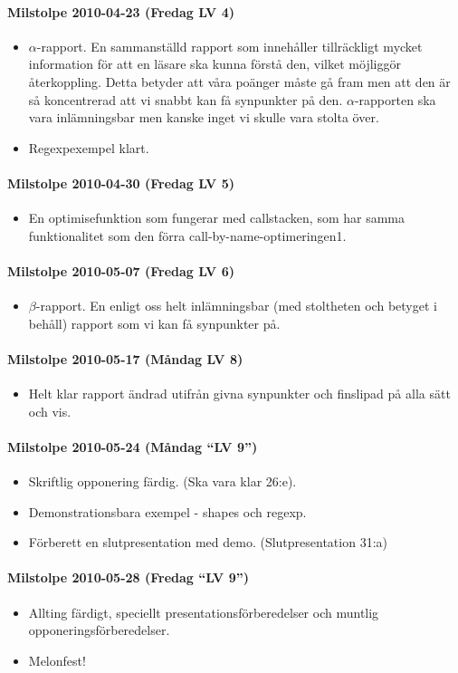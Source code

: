 \documentclass[../Appendix]{subfiles}
\begin{document}
\paragraph{Milstolpe 2010-04-23 (Fredag LV 4)}
\begin{itemize}
\item $\alpha$-rapport. En sammanställd rapport som innehåller tillräckligt
mycket information för att en läsare ska kunna förstå den, vilket
möjliggör återkoppling. Detta betyder att våra poänger måste gå fram
men att den är så koncentrerad att vi snabbt kan få synpunkter på
den. $\alpha$-rapporten ska vara inlämningsbar men kanske inget vi
skulle vara stolta över.
\item Regexpexempel klart.
\end{itemize}

\paragraph{Milstolpe 2010-04-30 (Fredag LV 5)}
\begin{itemize}
\item En optimisefunktion som fungerar med callstacken, som har samma funktionalitet
som den förra call-by-name-optimeringen1.
\end{itemize}

\paragraph{Milstolpe 2010-05-07 (Fredag LV 6)}
\begin{itemize}
\item $\beta$-rapport. En enligt oss helt inlämningsbar (med stoltheten
och betyget i behåll) rapport som vi kan få synpunkter på.
\end{itemize}

\paragraph{Milstolpe 2010-05-17 (Måndag LV 8)}
\begin{itemize}
\item Helt klar rapport ändrad utifrån givna synpunkter och finslipad
på alla sätt och vis.
\end{itemize}

\paragraph{Milstolpe 2010-05-24 (Måndag {}``LV 9'')}
\begin{itemize}
\item Skriftlig opponering färdig. (Ska vara klar 26:e).
\item Demonstrationsbara exempel - shapes och regexp.
\item Förberett en slutpresentation med demo. (Slutpresentation 31:a)
\end{itemize}

\paragraph{Milstolpe 2010-05-28 (Fredag {}``LV 9'')}
\begin{itemize}
\item Allting färdigt, speciellt presentationsförberedelser och muntlig
opponeringsförberedelser. 
\item Melonfest!
\end{itemize}
\end{document}
